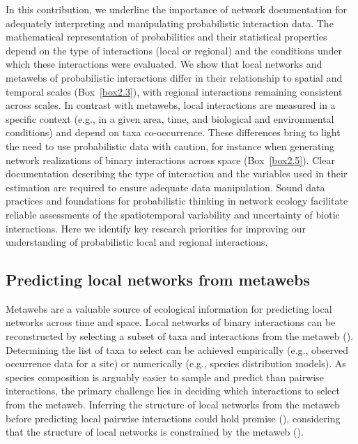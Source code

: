 In this contribution, we underline the importance of network documentation for
adequately interpreting and manipulating probabilistic interaction data. The
mathematical representation of probabilities and their statistical properties
depend on the type of interactions (local or regional) and the conditions under
which these interactions were evaluated. We show that local networks and
metawebs of probabilistic interactions differ in their relationship to spatial
and temporal scales (Box~\ref{box2.3}), with regional interactions remaining consistent
across scales. In contrast with metawebs, local interactions are measured in a
specific context (e.g., in a given area, time, and biological and environmental
conditions) and depend on taxa co-occurrence. These differences bring to light
the need to use probabilistic data with caution, for instance when generating
network realizations of binary interactions across space (Box~\ref{box2.5}). Clear
documentation describing the type of interaction and the variables used in their
estimation are required to ensure adequate data manipulation. Sound data
practices and foundations for probabilistic thinking in network ecology
facilitate reliable assessments of the spatiotemporal variability and
uncertainty of biotic interactions. Here we identify key research priorities for
improving our understanding of probabilistic local and regional interactions.

\subsection{Predicting local networks from metawebs}

Metawebs are a valuable source of ecological information for predicting local
networks across time and space. Local networks of binary interactions can be
reconstructed by selecting a subset of taxa and interactions from the metaweb
(\cite{Dunne2006Network}). Determining the list of taxa to select can be achieved
empirically (e.g., observed occurrence data for a site) or numerically (e.g.,
species distribution models). As species composition is arguably easier to
sample and predict than pairwise interactions, the primary challenge lies in
deciding which interactions to select from the metaweb. Inferring the structure
of local networks from the metaweb before predicting local pairwise interactions
could hold promise (\cite{Strydom2021Roadmapa}), considering that the structure of
local networks is constrained by the metaweb (\cite{Saravia2022Ecological}).

